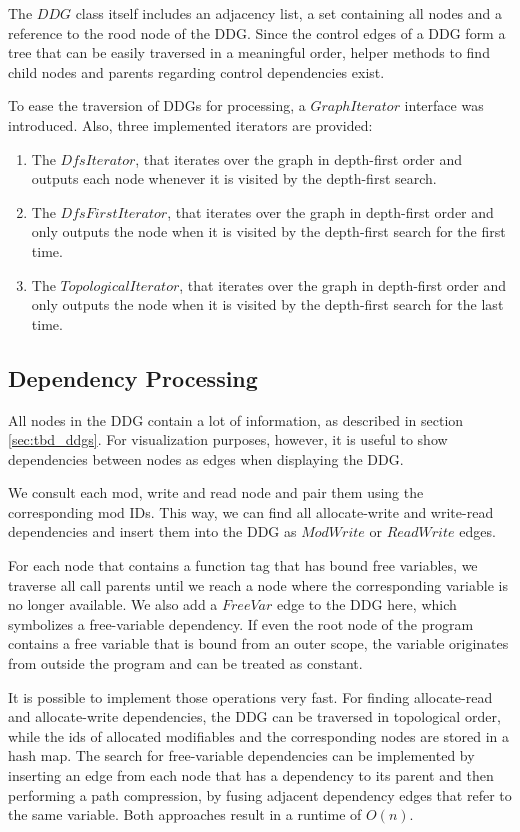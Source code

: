 The $DDG$ class itself includes an adjacency list, a set containing all nodes and a reference to the rood node of the DDG. Since the control edges of a DDG form a tree that can be easily traversed in a meaningful order, helper methods to find child nodes and parents regarding control dependencies exist. 

To ease the traversion of DDGs for processing, a $GraphIterator$ interface was introduced. Also, three implemented iterators are provided: 

\begin{enumerate}
\item The $DfsIterator$, that iterates over the graph in depth-first order and outputs each node whenever it is visited by the depth-first search. 
\item The $DfsFirstIterator$, that iterates over the graph in depth-first order and only outputs the node when it is visited by the depth-first search for the first time.
\item The $TopologicalIterator$, that iterates over the graph in depth-first order and only outputs the node when it is visited by the depth-first search for the last time.  
\end{enumerate}

\subsection{Dependency Processing}

All nodes in the DDG contain a lot of information, as described in section \ref{sec:tbd_ddgs}. For visualization purposes, however, it is useful to show dependencies between nodes as edges when displaying the DDG. 

We consult each mod, write and read node and pair them using the corresponding mod IDs. This way, we can find all allocate-write and write-read dependencies and insert them into the DDG as $ModWrite$ or $ReadWrite$ edges.

For each node that contains a function tag that has bound free variables, we traverse all call parents until we reach a node where the corresponding variable is no longer available. We also add a $FreeVar$ edge to the DDG here, which symbolizes a free-variable dependency. If even the root node of the program contains a free variable that is bound from an outer scope, the variable originates from outside the program and can be treated as constant. 

It is possible to implement those operations very fast. For finding allocate-read and allocate-write dependencies, the DDG can be traversed in topological order, while the ids of allocated modifiables and the corresponding nodes are stored in a hash map. The search for free-variable dependencies can be implemented by inserting an edge from each node that has a dependency to its parent and then performing a path compression, by fusing adjacent dependency edges that refer to the same variable. Both approaches result in a runtime of $O(n)$.

